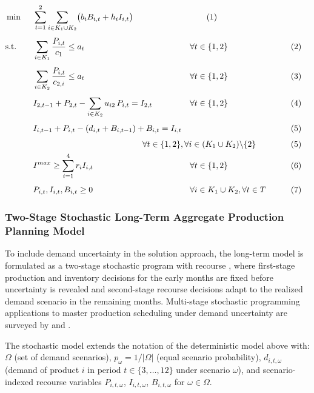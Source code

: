 \documentclass[11pt]{article}
\begin{document}
\begin{alignat}{4}
&\min && \sum_{t=1}^{2}\sum_{i \in K_1 \cup K_2}\bigl(b_iB_{i,t}+h_iI_{i,t}\bigr)
&& \tag{1} \\[4pt]
&\text{s.t.} \quad
&& \sum_{i \in K_1}\frac{P_{i,t}}{c_1} \leq a_t  && \forall t\in \{1,2\} &&\tag{2}\\[4pt]
&&& \sum_{i \in K_2}\frac{P_{i,t}}{c_{2,i}}  \leq a_t  && \forall t\in \{1,2\} &&\tag{3}\\[4pt]
&&& I_{2,t-1}+P_{2,t}-\sum_{i\in K_2}u_{i2}\,P_{i,t} = I_{2,t} \quad && \forall t\in \{1,2\} &&\tag{4}\\[4pt]
&&& I_{i,t-1}+P_{i,t} - (d_{i,t}+B_{i,t-1})+B_{i,t} = I_{i,t}
&&  &&\tag{5}\\[4pt]
&&& && \hspace{-2cm} \forall t\in \{1,2\},\forall i\in (K_1 \cup K_2)\backslash \{2\} &&\tag{5}\\
&&& I^{max} \geq \sum_{i=1}^{4} r_i I_{i,t} && \forall t\in \{1,2\} &&\tag{6}\\[4pt]
&&& P_{i,t},I_{i,t},B_{i,t} \geq 0
&& \forall i\in K_1 \cup K_2,\forall t\in T
&&\tag{7}
\end{alignat}




\subsubsection{Two-Stage Stochastic Long-Term Aggregate Production Planning Model}
To include demand uncertainty in the solution approach, the long-term model is formulated as a two-stage stochastic program with recourse \citep{BirgeLouveaux2011}, where first-stage production and inventory decisions for the early months are fixed before uncertainty is revealed and second-stage recourse decisions adapt to the realized demand scenario in the remaining months. Multi-stage stochastic programming applications to master production scheduling under demand uncertainty are surveyed by \cite{korpeoglu2011} and \cite{thevenin2021mrp}.

The stochastic model extends the notation of the deterministic model above with: $\Omega$ (set of demand scenarios), $p_\omega = 1/|\Omega|$ (equal scenario probability), $d_{i,t,\omega}$ (demand of product $i$ in period $t\in\{3,\ldots,12\}$ under scenario $\omega$), and scenario-indexed recourse variables $P_{i,t,\omega}$, $I_{i,t,\omega}$, $B_{i,t,\omega}$ for $\omega\in\Omega$.
\end{document}

